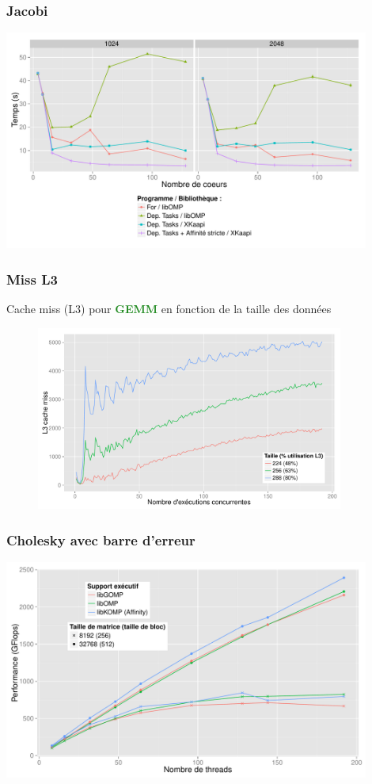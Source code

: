 \documentclass[xcolor={usenames,dvipsnames,svgnames,table}, aspectratio=43]{beamer}
\newcommand{\gemmcolor}[1]{\textcolor{ForestGreen}{\textbf{#1}}\xspace}
\newcommand{\gemm}{\gemmcolor{GEMM}}
\begin{document}
\appendix

\begin{frame}
  \frametitle{Jacobi}

  \includegraphics[width=0.9\textwidth]{graph/jacobi_scale_iomp_komp.pdf}

\end{frame}

\begin{frame}
  \frametitle{Miss L3}

  Cache miss (L3) pour \gemm en fonction de la taille des données
  \begin{figure}
    \centering
    \includegraphics[width=0.9\textwidth]{graph/dgemm_local_miss.pdf}
  \end{figure}


\end{frame}

\begin{frame}
  \frametitle{Cholesky avec barre d'erreur}

  \includegraphics[width=0.9\textwidth]{graph/graph_all_cholesky_idchire.pdf}

\end{frame}
\end{document}
